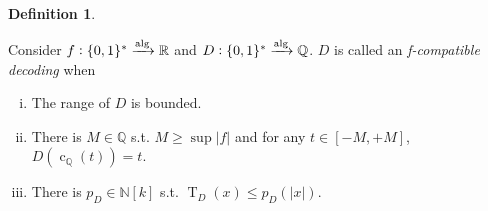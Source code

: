 \documentclass{article}
\numberwithin{equation}{section}
\theoremstyle{definition}
\newtheorem{definition}{Definition}[section]
\theoremstyle{plain}
\newcommand{\Bool}{\{0,1\}}
\newcommand{\Words}{{\Bool^*}}
\DeclareMathOperator{\T}{T}
\DeclareMathOperator{\En}{c}
\newcommand{\Nats}{\mathbb{N}}
\newcommand{\Rats}{\mathbb{Q}}
\newcommand{\Reals}{\mathbb{R}}
\newcommand{\Abs}[1]{\lvert #1 \rvert}
\newcommand{\Alg}{\xrightarrow{\textnormal{alg}}}
\begin{document}
\begin{samepage}
\begin{definition}
\label{def:decod}

Consider ${f: \Words \Alg \Reals}$ and ${D: \Words \Alg \Rats}$. ${D}$ is called an \emph{f-compatible decoding} when

\begin{enumerate}[(i)]

\item\label{con:def__decod__bnd} The range of ${D}$ is bounded.

\item\label{con:def__decod__inv} There is ${M \in \Rats}$ s.t. ${M \geq \sup \Abs{f}}$ and for any ${t \in [-M,+M]}$, ${D(\En_\Rats(t))=t}$.

\item\label{con:def__decod__time} There is $p_D \in \Nats[k]$ s.t. ${\T_D(x) \leq p_D(\Abs{x})}$.

\end{enumerate}

\end{definition}
\end{samepage}
\end{document}
